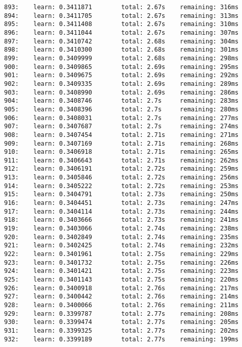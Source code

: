 \documentclass[11pt]{article}
\begin{document}
\begin{Verbatim}[commandchars=\\\{\}]
893:    learn: 0.3411871        total: 2.67s    remaining: 316ms
894:    learn: 0.3411705        total: 2.67s    remaining: 313ms
895:    learn: 0.3411408        total: 2.67s    remaining: 310ms
896:    learn: 0.3411044        total: 2.67s    remaining: 307ms
897:    learn: 0.3410742        total: 2.68s    remaining: 304ms
898:    learn: 0.3410300        total: 2.68s    remaining: 301ms
899:    learn: 0.3409999        total: 2.68s    remaining: 298ms
900:    learn: 0.3409865        total: 2.69s    remaining: 295ms
901:    learn: 0.3409675        total: 2.69s    remaining: 292ms
902:    learn: 0.3409335        total: 2.69s    remaining: 289ms
903:    learn: 0.3408990        total: 2.69s    remaining: 286ms
904:    learn: 0.3408746        total: 2.7s     remaining: 283ms
905:    learn: 0.3408396        total: 2.7s     remaining: 280ms
906:    learn: 0.3408031        total: 2.7s     remaining: 277ms
907:    learn: 0.3407687        total: 2.7s     remaining: 274ms
908:    learn: 0.3407454        total: 2.71s    remaining: 271ms
909:    learn: 0.3407169        total: 2.71s    remaining: 268ms
910:    learn: 0.3406918        total: 2.71s    remaining: 265ms
911:    learn: 0.3406643        total: 2.71s    remaining: 262ms
912:    learn: 0.3406191        total: 2.72s    remaining: 259ms
913:    learn: 0.3405846        total: 2.72s    remaining: 256ms
914:    learn: 0.3405222        total: 2.72s    remaining: 253ms
915:    learn: 0.3404791        total: 2.73s    remaining: 250ms
916:    learn: 0.3404451        total: 2.73s    remaining: 247ms
917:    learn: 0.3404114        total: 2.73s    remaining: 244ms
918:    learn: 0.3403666        total: 2.73s    remaining: 241ms
919:    learn: 0.3403066        total: 2.74s    remaining: 238ms
920:    learn: 0.3402849        total: 2.74s    remaining: 235ms
921:    learn: 0.3402425        total: 2.74s    remaining: 232ms
922:    learn: 0.3401961        total: 2.75s    remaining: 229ms
923:    learn: 0.3401732        total: 2.75s    remaining: 226ms
924:    learn: 0.3401421        total: 2.75s    remaining: 223ms
925:    learn: 0.3401143        total: 2.75s    remaining: 220ms
926:    learn: 0.3400918        total: 2.76s    remaining: 217ms
927:    learn: 0.3400442        total: 2.76s    remaining: 214ms
928:    learn: 0.3400066        total: 2.76s    remaining: 211ms
929:    learn: 0.3399787        total: 2.77s    remaining: 208ms
930:    learn: 0.3399474        total: 2.77s    remaining: 205ms
931:    learn: 0.3399325        total: 2.77s    remaining: 202ms
932:    learn: 0.3399189        total: 2.77s    remaining: 199ms

\end{Verbatim}
\end{document}
